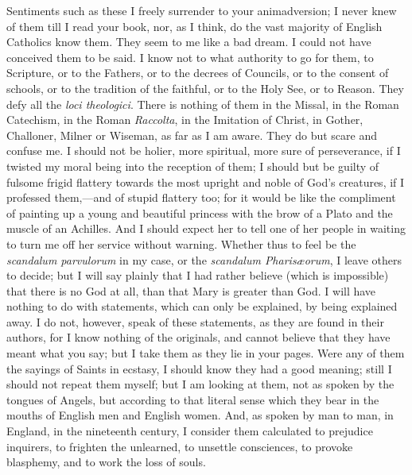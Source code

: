 Sentiments such as these I freely surrender to your animadversion; I
never knew of them till I read your book, nor, as I think, do the vast
majority of English Catholics know them. They seem to me like a bad
dream. I could not have conceived them to be said. I know not to what
authority to go for them, to Scripture, or to the Fathers, or to the
decrees of Councils, or to the consent of schools, or to the tradition
of the faithful, or to the Holy See, or to Reason. They defy all the \emph{loci
theologici}. There is nothing of them in the Missal, in the Roman
Catechism, in the Roman \emph{Raccolta}, in the Imitation of Christ, in
Gother, Challoner, Milner or Wiseman, as far as I am aware. They do but
scare and confuse me. I should not be holier, more spiritual, more sure
of perseverance, if I twisted my moral being into the reception of
them; I should but be guilty of fulsome frigid flattery towards the most
upright and noble of God's creatures, if I professed them,—and of
stupid flattery too; for it would be like the compliment of painting up
a young and beautiful princess with the brow of a Plato and the muscle
of an Achilles. And I should expect her to tell one of her people in
waiting to turn me off her service without warning. Whether thus to feel
be the \emph{scandalum parvulorum} in my case, or the \emph{scandalum
Pharisæorum}, I leave others to decide; but I will say plainly that
I had rather believe (which is impossible) that there is no God at all,
than that Mary is greater than God. I will have nothing to do with
statements, which can only be explained, by being explained away. I do
not, however, speak of these statements, as they are found in their
authors, for I know nothing of the originals, and cannot believe that
they have meant what you say; but I take them as they lie in your pages.
Were any of them the sayings of Saints in ecstasy, I should know they
had a good meaning; still I should not repeat them myself; but I am
looking at them, not as spoken by the tongues of Angels, but according
to that literal sense which they bear in the mouths of English men and
English women. And, as spoken by man to man, in England, in the
nineteenth century, I consider them calculated to prejudice inquirers,
to frighten the unlearned, to unsettle consciences, to provoke
blasphemy, and to work the loss of souls.

